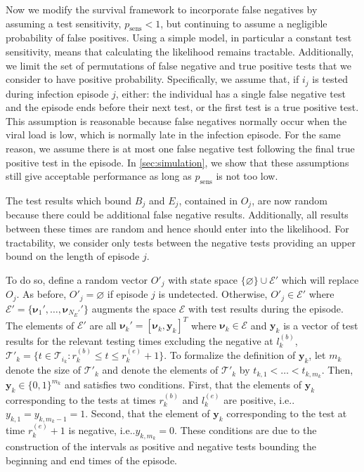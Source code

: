 \documentclass[referee,useAMS,usenatbib]{biom}
\makeatletter
\newcommand\set{\mathcal}
\renewcommand{\vec}[1]{\bm{#1}}
\newcommand{\ssep}{:}
\newcommand{\psens}{p_\text{sens}}
\newcommand{\sched}{\mathcal{T}}
\DeclareRobustCommand\onedot{\futurelet\@let@token\@onedot}
\def\@onedot{\ifx\@let@token.\else.\null\fi\xspace}
\def\ie{i.e\onedot} \def\Ie{{I.e}\onedot}
\makeatother
\begin{document}
Now we modify the survival framework to incorporate false negatives by assuming a test sensitivity, $\psens < 1$, but continuing to assume a negligible probability of false positives.
Using a simple model, in particular a constant test sensitivity, means that calculating the likelihood remains tractable.
Additionally, we limit the set of permutations of false negative and true positive tests that we consider to have positive probability.
Specifically, we assume that, if $i_j$ is tested during infection episode $j$, either: the individual has a single false negative test and the episode ends before their next test, or the first test is a true positive test.
This assumption is reasonable because false negatives normally occur when the viral load is low, which is normally late in the infection episode.
For the same reason, we assume there is at most one false negative test following the final true positive test in the episode.
In \cref{sec:simulation}, we show that these assumptions still give acceptable performance as long as $\psens$ is not too low.

The test results which bound $B_j$ and $E_j$, contained in $O_j$, are now random because there could be additional false negative results.
Additionally, all results between these times are random and hence should enter into the likelihood.
For tractability, we consider only tests between the negative tests providing an upper bound on the length of episode $j$.

To do so, define a random vector $O'_j$ with state space $\{\varnothing\} \cup \set{E}'$ which will replace $O_j$.
As before, $O'_j = \varnothing$ if episode $j$ is undetected.
Otherwise, $O'_j \in \set{E}'$ where $\set{E}' = \{ \vec{\nu}_1', \dots, \vec{\nu}_{N_E'}' \}$ augments the space $\set{E}$ with test results during the episode.
The elements of $\set{E}'$ are all $\vec{\nu}_k' = [\vec{\nu}_k, \vec{y}_k]^T$ where $\vec{\nu}_k \in \set{E}$ and $\vec{y}_k$ is a vector of test results for the relevant testing times excluding the negative at $l^{(b)}_k$, $\sched'_k = \{ t \in \sched_{i_k} \ssep r_k^{(b)} \leq t \leq r_k^{(e)} + 1 \}$.
To formalize the definition of $\vec{y}_k$, let $m_k$ denote the size of $\sched'_k$ and denote the elements of $\sched'_k$ by $t_{k,1} < \dots < t_{k,m_k}$.
Then, $\vec{y}_k \in \{0, 1\}^{m_k}$ and satisfies two conditions.
First, that the elements of $\vec{y}_k$ corresponding to the tests at times $r_k^{(b)}$ and $l_k^{(e)}$ are positive, \ie $y_{k,1} = y_{k,m_k-1} = 1$.
Second, that the element of $\vec{y}_k$ corresponding to the test at time $r_k^{(e)} + 1$ is negative, \ie $y_{k,m_k} = 0$.
These conditions are due to the construction of the intervals as positive and negative tests bounding the beginning and end times of the episode.
\end{document}
